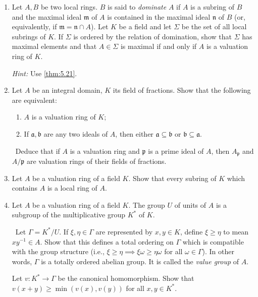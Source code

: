 \begin{enumerate}
    \emph{Valuation rings and valuations.}

    \item \label{exer27-chapter5} Let $A, B$ be two local rings. $B$ is said to \emph{dominate} $A$ if $A$ is a subring of $B$ and the maximal ideal $\mathfrak{m}$ of $A$ is contained in the maximal ideal $\mathfrak{n}$ of $B$ (or, equivalently, if $\mathfrak{m} = \mathfrak{n} \cap A$). Let $K$ be a field and let $\Sigma$ be the set of all local subrings of $K$. If $\Sigma$ is ordered by the relation of domination, show that $\Sigma$ has maximal elements and that $A \in \Sigma$ is maximal if and only if $A$ is a valuation ring of $K$.
    
    \textit{Hint:} Use \eqref{thm:5.21}.

    \item \label{exer28-chapter5}Let $A$ be an integral domain, $K$ its field of fractions. Show that the following are equivalent:
    \begin{enumerate}
        \item[(1)] $A$ is a valuation ring of $K$;
        \item[(2)] If $\mathfrak{a}, \mathfrak{b}$ are any two ideals of $A$, then either $\mathfrak{a} \subseteq \mathfrak{b}$ or $\mathfrak{b} \subseteq \mathfrak{a}$.
    \end{enumerate}
    \quad\, Deduce that if $A$ is a valuation ring and $\mathfrak{p}$ is a prime ideal of $A$, then $A_{\mathfrak{p}}$ and $A/\mathfrak{p}$ are valuation rings of their fields of fractions.

    \item \label{exer29-chapter5}Let $A$ be a valuation ring of a field $K$. Show that every subring of $K$ which contains $A$ is a local ring of $A$.

    \item \label{exer30-chapter5}Let $A$ be a valuation ring of a field $K$. The group $U$ of units of $A$ is a subgroup of the multiplicative group $K^*$ of $K$.
    
    \quad\, Let $\Gamma = K^*/U$. If $\xi, \eta \in \Gamma$ are represented by $x, y \in K$, define $\xi \geq \eta$ to mean $xy^{-1} \in A$. Show that this defines a total ordering on $\Gamma$ which is compatible with the group structure (i.e., $\xi \geq \eta \implies \xi\omega \geq \eta\omega$ for all $\omega \in \Gamma$). In other words, $\Gamma$ is a totally ordered abelian group. It is called the \emph{value group} of $A$.
    
    Let $v \colon K^* \to \Gamma$ be the canonical homomorphism. Show that $v(x + y) \geq \min(v(x), v(y))$ for all $x, y \in K^*$.


\end{enumerate}
